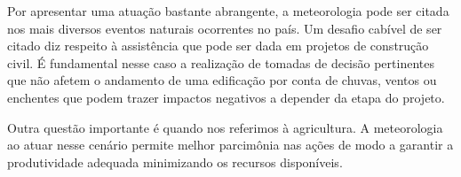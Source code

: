 \newpar Por apresentar uma atuação bastante abrangente, a meteorologia pode ser citada nos mais diversos eventos naturais ocorrentes no país. Um desafio cabível de ser citado diz respeito à assistência que pode ser dada em projetos de construção civil. É fundamental nesse caso a realização de tomadas de decisão pertinentes que não afetem o andamento de uma edificação por conta de chuvas, ventos ou enchentes que podem trazer impactos negativos a depender da etapa do projeto.

\newpar Outra questão importante é quando nos referimos à agricultura. A meteorologia ao atuar nesse cenário permite melhor parcimônia nas ações de modo a garantir a produtividade adequada minimizando os recursos disponíveis. 